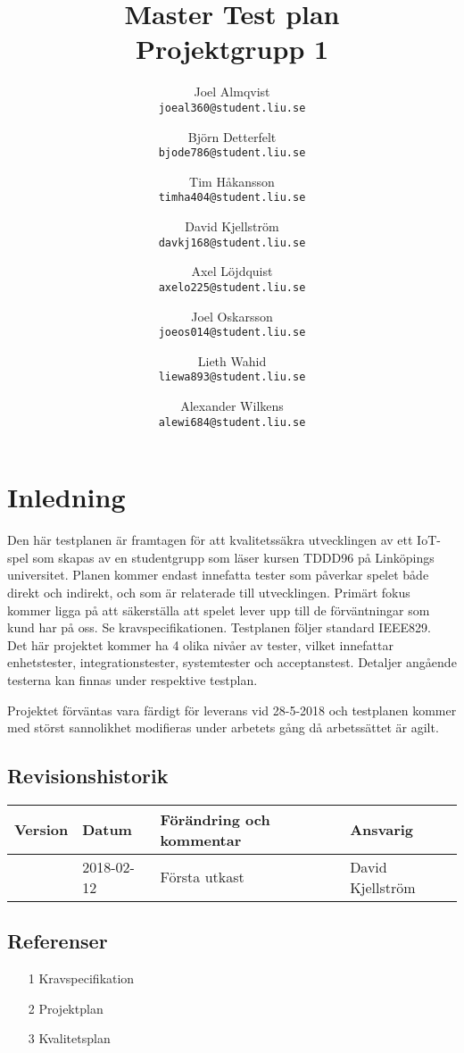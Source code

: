 \documentclass[10pt]{article}
\title{Master Test plan\\
    \large Projektgrupp 1}
\author{
    Joel Almqvist\\
    \texttt{joeal360@student.liu.se}
    \and
    Björn Detterfelt\\
    \texttt{bjode786@student.liu.se}
    \and
    Tim Håkansson\\
    \texttt{timha404@student.liu.se}
    \and
    David Kjellström\\
    \texttt{davkj168@student.liu.se}
    \and
    Axel Löjdquist\\
    \texttt{axelo225@student.liu.se}
    \and
    Joel Oskarsson\\
    \texttt{joeos014@student.liu.se}
    \and
    Lieth Wahid\\
    \texttt{liewa893@student.liu.se}
    \and
    Alexander Wilkens\\
    \texttt{alewi684@student.liu.se}
}
\begin{document}

\maketitle
\pagebreak
\tableofcontents
\pagebreak
{}

\section{Inledning}
	Den här testplanen är framtagen för att kvalitetssäkra utvecklingen av ett IoT-spel som skapas av en studentgrupp som läser kursen TDDD96 på Linköpings universitet. Planen kommer endast innefatta tester som påverkar spelet både direkt och indirekt, och som är relaterade till utvecklingen. Primärt fokus kommer ligga på att säkerställa att spelet lever upp till de förväntningar som kund har på oss. {\color{red}Se kravspecifikationen}. Testplanen följer standard IEEE829. \\

Det här projektet kommer ha 4 olika nivåer av tester, vilket innefattar enhetstester, integrationstester, systemtester och acceptanstest. Detaljer angående testerna kan finnas under respektive testplan.

Projektet förväntas vara färdigt för leverans vid {\color{red}28-5-2018} och testplanen kommer med störst sannolikhet modifieras under arbetets gång då arbetssättet är agilt.

	\subsection{Revisionshistorik}

	
	\begin{center}
 	   \begin{tabular}{| l | l | l |  l | }
 	       \hline
 	       \textbf{Version} & \textbf{Datum} & \textbf{Förändring och kommentar} & \textbf{Ansvarig} \\
 	       \hline
 	       \centering 0.1 & 2018-02-12 & Första utkast & David Kjellström\\
 	       \hline
 	   \end{tabular}
	\end{center}

  
	
	\subsection{Referenser}
		\begin{itemize}
		\item [1] Kravspecifikation
		\item [2] Projektplan
		\item [3] Kvalitetsplan
		\end{itemize}
\end{document}
